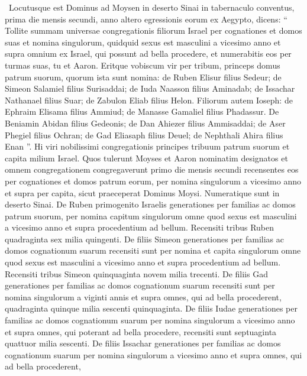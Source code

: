 \begin{biblechapter}
 Locutusque est Dominus ad Moysen in deserto Sinai in tabernaculo conventus, prima die mensis secundi, anno altero egressionis eorum ex Aegypto, dicens: 
\verse “ Tollite summam universae congregationis filiorum Israel per cognationes et domos suas et nomina singulorum, quidquid sexus est masculini 
\verse a vicesimo anno et supra omnium ex Israel, qui possunt ad bella procedere, et numerabitis eos per turmas suas, tu et Aaron.
 \verse Eritque vobiscum vir per tribum, princeps domus patrum suorum, 
\verse quorum ista sunt nomina: de Ruben Elisur filius Sedeur; 
\verse de Simeon Salamiel filius Surisaddai; 
\verse de Iuda Naasson filius Aminadab; 
\verse de Issachar Nathanael filius Suar; 
\verse de Zabulon Eliab filius Helon. 
\verse Filiorum autem Ioseph: de Ephraim Elisama filius Ammiud; de Manasse Gamaliel filius Phadassur. 
\verse De Beniamin Abidan filius Gedeonis; 
\verse de Dan Ahiezer filius Ammisaddai; 
 \verse de Aser Phegiel filius Ochran; 
\verse de Gad Eliasaph filius Deuel; 
\verse de Nephthali Ahira filius Enan ”.
 \verse Hi viri nobilissimi congregationis principes tribuum patrum suorum et capita milium Israel. 
\verse Quos tulerunt Moyses et Aaron nominatim designatos 
\verse et omnem congregationem congregaverunt primo die mensis secundi recensentes eos per cognationes et domos patrum eorum, per nomina singulorum a vicesimo anno et supra per capita, 
\verse sicut praeceperat Dominus Moysi. Numeratique sunt in deserto Sinai.
 \verse De Ruben primogenito Israelis generationes per familias ac domos patrum suorum, per nomina capitum singulorum omne quod sexus est masculini a vicesimo anno et supra procedentium ad bellum. 
\verse Recensiti tribus Ruben quadraginta sex milia quingenti.
 \verse De filiis Simeon generationes per familias ac domos cognationum suarum recensiti sunt per nomina et capita singulorum omne quod sexus est masculini a vicesimo anno et supra procedentium ad bellum. 
\verse Recensiti tribus Simeon quinquaginta novem milia trecenti.
 \verse De filiis Gad generationes per familias ac domos cognationum suarum recensiti sunt per nomina singulorum a viginti annis et supra omnes, qui ad bella procederent, 
\verse quadraginta quinque milia sescenti quinquaginta.
 \verse De filiis Iudae generationes per familias ac domos cognationum suarum per nomina singulorum a vicesimo anno et supra omnes, qui poterant ad bella procedere, 
\verse recensiti sunt septuaginta quattuor milia sescenti.
 \verse De filiis Issachar generationes per familias ac domos cognationum suarum per nomina singulorum a vicesimo anno et supra omnes, qui ad bella procederent, 

\end{biblechapter}
